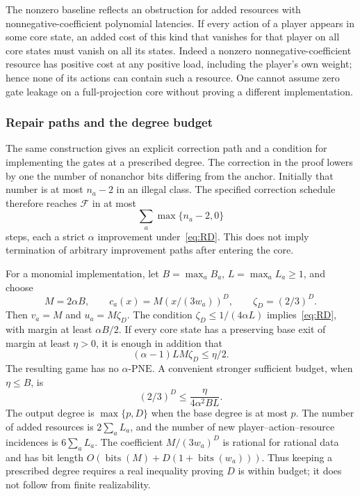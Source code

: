 \documentclass[manuscript,review,anonymous]{acmart}
\newcommand{\PNE}{\mathrm{PNE}}
\newcommand{\F}{\mathcal F}
\begin{document}
The nonzero baseline reflects an obstruction for added resources with nonnegative-coefficient polynomial latencies. If every action of a player appears in some core state, an added cost of this kind that vanishes for that player on all core states must vanish on all its states. Indeed a nonzero nonnegative-coefficient resource has positive cost at any positive load, including the player's own weight; hence none of its actions can contain such a resource. One cannot assume zero gate leakage on a full-projection core without proving a different implementation.

\subsubsection{Repair paths and the degree budget}
The same construction gives an explicit correction path and a condition for implementing the gates at a prescribed degree.
The correction in the proof lowers by one the number of nonanchor bits differing from the anchor. Initially that number is at most $n_a-2$ in an illegal class. The specified correction schedule therefore reaches $\F$ in at most
\begin{equation}\label{eq:repairsteps}
 \sum_a\max\{n_a-2,0\}
\end{equation}
steps, each a strict $\alpha$ improvement under~\eqref{eq:RD}. This does not imply termination of arbitrary improvement paths after entering the core.

For a monomial implementation, let $B=\max_aB_a$, $L=\max_aL_a\ge1$, and choose
\[
 M=2\alpha B,\qquad c_a(x)=M(x/(3w_a))^D,\qquad\zeta_D=(2/3)^D.
\]
Then $v_a=M$ and $u_a=M\zeta_D$. The condition $\zeta_D\le1/(4\alpha L)$ implies~\eqref{eq:RD}, with margin at least $\alpha B/2$. If every core state has a preserving base exit of margin at least $\eta>0$, it is enough in addition that
\begin{equation}\label{eq:compilerbudget}
 (\alpha-1)LM\zeta_D\le\eta/2.
\end{equation}
The resulting game has no $\alpha$-$\PNE$. A convenient stronger sufficient budget, when $\eta\le B$, is
\begin{equation}\label{eq:safebudget}
 (2/3)^D\le\frac{\eta}{4\alpha^2BL}.
\end{equation}
The output degree is $\max\{p,D\}$ when the base degree is at most $p$. The number of added resources is $2\sum_aL_a$, and the number of new player--action--resource incidences is $6\sum_aL_a$. The coefficient $M/(3w_a)^D$ is rational for rational data and has bit length $O(\operatorname{bits}(M)+D(1+\operatorname{bits}(w_a)))$. Thus keeping a prescribed degree requires a real inequality proving $D$ is within budget; it does not follow from finite realizability.
\end{document}
